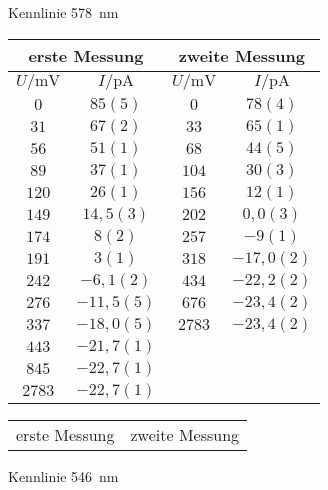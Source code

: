 \begin{figure}[htbp]
   \centering
\parbox{0.475\linewidth}{\centering
\caption{Kennlinie \SI{578}{nm}}
\begin{tabular}{cc||cc}
\hline\multicolumn{2}{c||}{erste Messung} & \multicolumn{2}{c}{zweite Messung}\\

\hline
$U / \unit{\milli\volt}$ & $I / \unit{\pico\ampere}$ & $U / \unit{\milli\volt}$ & $I / \unit{\pico\ampere}$ \\ 
\hline
$0$ & $85(5)$ & $0$ & $78(4)$ \\
$31$ & $67(2)$ & $33$ & $65(1)$ \\
$56$ & $51(1)$ & $68$ & $44(5)$ \\
$89$ & $37(1)$ & $104$ & $30(3)$ \\
$120$ & $26(1)$ & $156$ & $12(1)$ \\
$149$ & $14,5(3)$ & $202$ & $0,0(3)$ \\
$174$ & $8(2)$ & $257$ & $-9(1)$ \\
$191$ & $3(1)$ & $318$ & $-17,0(2)$ \\
$242$ & $-6,1(2)$ & $434$ & $-22,2(2)$ \\
$276$ & $-11,5(5)$ & $676$ & $-23,4(2)$ \\
$337$ & $-18,0(5)$ & $2783$ & $-23,4(2)$ \\
$443$ & $-21,7(1)$ &    &    \\
$845$ & $-22,7(1)$ &    &    \\
$2783$ & $-22,7(1)$ &    &    \\
\hline\end{tabular}
\label{kennlinie_578nm}
}\quad\parbox{0.475\linewidth}{\centering
\caption{Kennlinie \SI{546}{nm}}
\begin{tabular}{cc||cc}
\hline\multicolumn{2}{c||}{erste Messung} & \multicolumn{2}{c}{zweite Messung}\\


\end{tabular}}
\end{figure}
